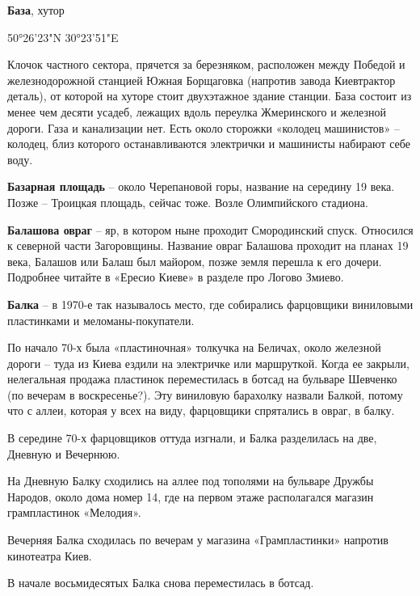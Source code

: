 \medskip


\textbf{База}, хутор

50°26'23"N 30°23'51"E

Клочок частного сектора, прячется за березняком, расположен между Победой и железнодорожной станцией Южная Борщаговка (напротив завода Киевтрактор деталь), от которой на хуторе стоит двухэтажное здание станции. База состоит из менее чем десяти усадеб, лежащих вдоль переулка Жмеринского и железной дороги. Газа и канализации нет. Есть около сторожки «колодец машинистов» – колодец, близ которого останавливаются электрички и машинисты набирают себе воду.\\

\medskip


\textbf{Базарная площадь} – около Черепановой горы, название на середину 19 века. Позже – Троицкая площадь, сейчас тоже. Возле Олимпийского стадиона.\\

\medskip

\textbf{Балашова овраг} – яр, в котором ныне проходит Смородинский спуск. Относился к северной части Загоровщины. Название овраг Балашова проходит на планах 19 века, Балашов или Балаш был майором, позже земля перешла к его дочери. Подробнее читайте в «Ересио Киеве» в разделе про Логово Змиево.\\

\medskip


\textbf{Балка} – в 1970-е так называлось место, где собирались фарцовщики виниловыми пластинками и меломаны-покупатели. 

По начало 70-х была «пластиночная» толкучка на Беличах, около железной дороги – туда из Киева ездили на электричке или маршруткой. Когда ее закрыли, нелегальная продажа пластинок переместилась в ботсад на бульваре Шевченко (по вечерам в воскресенье?). Эту виниловую барахолку назвали Балкой, потому что с аллеи, которая у всех на виду, фарцовщики спрятались в овраг, в балку.

В середине 70-х фарцовщиков оттуда изгнали, и Балка разделилась на две, Дневную и Вечернюю.

На Дневную Балку сходились на аллее под тополями на бульваре Дружбы Народов, около дома номер 14, где на первом этаже располагался магазин грампластинок «Мелодия».

Вечерняя Балка сходилась по вечерам у магазина «Грампластинки» напротив кинотеатра Киев.

В начале восьмидесятых Балка снова переместилась в ботсад. 


